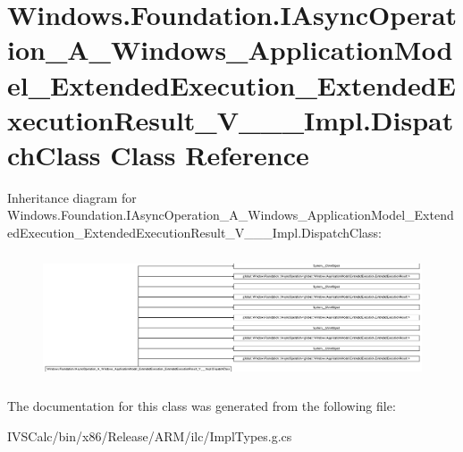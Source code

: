 \hypertarget{class_windows_1_1_foundation_1_1_i_async_operation___a___windows___application_model___extended_481783e97d2c7a7d757615cc8bf90ef7}{}\section{Windows.\+Foundation.\+I\+Async\+Operation\+\_\+\+A\+\_\+\+Windows\+\_\+\+Application\+Model\+\_\+\+Extended\+Execution\+\_\+\+Extended\+Execution\+Result\+\_\+\+V\+\_\+\+\_\+\+\_\+\+Impl.\+Dispatch\+Class Class Reference}
\label{class_windows_1_1_foundation_1_1_i_async_operation___a___windows___application_model___extended_481783e97d2c7a7d757615cc8bf90ef7}
Inheritance diagram for Windows.\+Foundation.\+I\+Async\+Operation\+\_\+\+A\+\_\+\+Windows\+\_\+\+Application\+Model\+\_\+\+Extended\+Execution\+\_\+\+Extended\+Execution\+Result\+\_\+\+V\+\_\+\+\_\+\+\_\+\+Impl.\+Dispatch\+Class\+:\begin{figure}[H]
\begin{center}
\leavevmode
\includegraphics[height=3.760684cm]{class_windows_1_1_foundation_1_1_i_async_operation___a___windows___application_model___extended_481783e97d2c7a7d757615cc8bf90ef7}
\end{center}
\end{figure}


The documentation for this class was generated from the following file\+:\begin{DoxyCompactItemize}
\item 
I\+V\+S\+Calc/bin/x86/\+Release/\+A\+R\+M/ilc/Impl\+Types.\+g.\+cs\end{DoxyCompactItemize}
